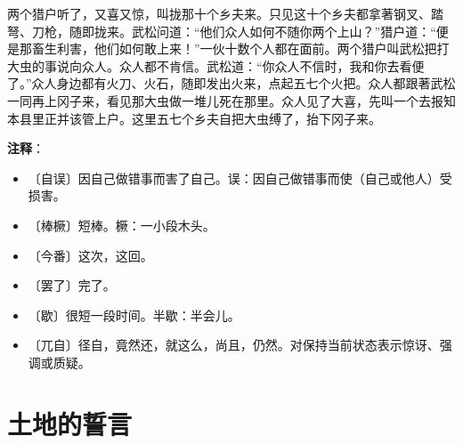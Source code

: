 \documentclass[12pt,UTF-8,openany]{ctexbook}
\begin{document}
\begin{normalsize}
    两个猎户听了，又喜又惊，叫拢那十个乡夫来。只见这十个乡夫都拿著钢叉、踏弩、刀枪，随即拢来。武松问道：“他们众人如何不随你两个上山？”猎户道：“便是那畜生利害，他们如何敢上来！”一伙十数个人都在面前。两个猎户叫武松把打大虫的事说向众人。众人都不肯信。武松道：“你众人不信时，我和你去看便了。”众人身边都有火刀、火石，随即发出火来，点起五七个火把。众人都跟著武松一同再上冈子来，看见那大虫做一堆儿死在那里。众人见了大喜，先叫一个去报知本县里正并该管上户。这里五七个乡夫自把大虫缚了，抬下冈子来。
    
\end{normalsize}


\newpage

\textbf{注释}：

\vspace{-1em}

\begin{itemize}
    \setlength\itemsep{-0.2em}
    \item 〔自误〕因自己做错事而害了自己。误：因自己做错事而使（自己或他人）受损害。
    \item 〔棒橛〕短棒。橛：一小段木头。
    \item 〔今番〕这次，这回。
    \item 〔罢了〕完了。
    \item 〔歇〕很短一段时间。半歇：半会儿。
    \item 〔兀自〕径自，竟然还，就这么，尚且，仍然。对保持当前状态表示惊讶、强调或质疑。
\end{itemize}

\chapter{土地的誓言}
\end{document}
